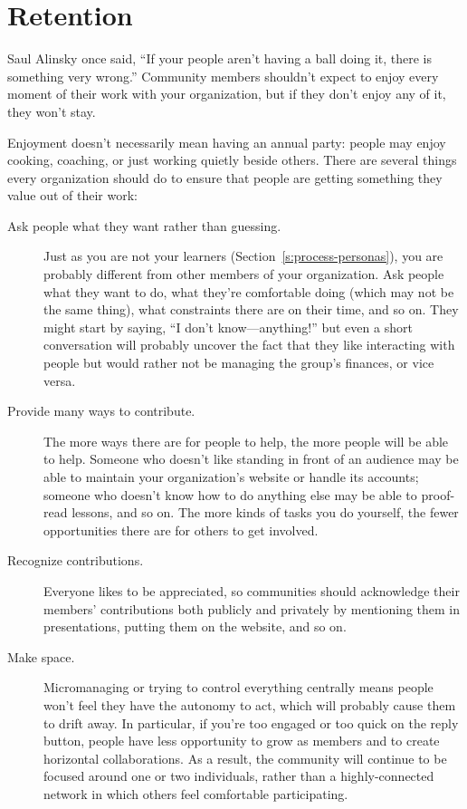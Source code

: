 \section{Retention}\label{s:community-retention}

Saul Alinsky once said, ``If your people aren't having a ball doing it,
there is something very wrong.'' \cite{Alin1989} Community members
shouldn't expect to enjoy every moment of their work with your
organization, but if they don't enjoy any of it, they won't stay.

Enjoyment doesn't necessarily mean having an annual party: people may
enjoy cooking, coaching, or just working quietly beside others. There
are several things every organization should do to ensure that people
are getting something they value out of their work:

\begin{description}
\item[Ask people what they want rather than guessing.]
Just as you are not your learners (Section~\ref{s:process-personas}),
you are probably different from other members of your organization.
Ask people what they want to do, what they're comfortable doing
(which may not be the same thing), what constraints there are on
their time, and so on. They might start by saying, ``I don't
know---anything!'' but even a short conversation will probably
uncover the fact that they like interacting with people but would
rather not be managing the group's finances, or vice versa.
\item[Provide many ways to contribute.]
The more ways there are for people to help, the more people will be
able to help. Someone who doesn't like standing in front of an
audience may be able to maintain your organization's website or
handle its accounts; someone who doesn't know how to do anything
else may be able to proof-read lessons, and so on. The more kinds of
tasks you do yourself, the fewer opportunities there are for others
to get involved.
\item[Recognize contributions.]
Everyone likes to be appreciated, so communities should acknowledge
their members' contributions both publicly and privately by
mentioning them in presentations, putting them on the website, and
so on.
\item[Make space.]
Micromanaging or trying to control everything centrally means people
won't feel they have the autonomy to act, which will probably cause
them to drift away. In particular, if you're too engaged or too
quick on the reply button, people have less opportunity to grow as
members and to create horizontal collaborations. As a result, the
community will continue to be focused around one or two individuals,
rather than a highly-connected network in which others feel
comfortable participating.
\end{description}

